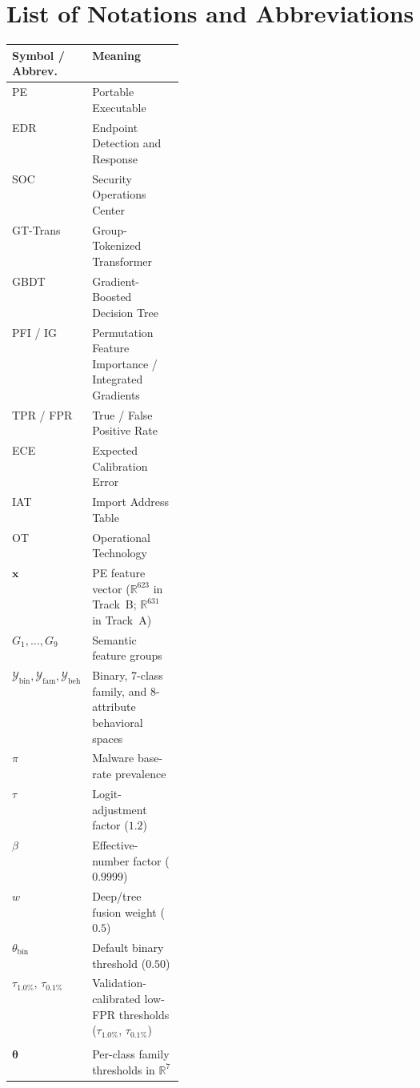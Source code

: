 \documentclass[Number]{sn-jnl}
\newcommand{\tauval}{\tau_{1.0\%}}
\newcommand{\tauzerov}{\tau_{0.1\%}}
\begin{document}
\section*{List of Notations and Abbreviations}
\begingroup
\small
\renewcommand{\arraystretch}{1.2}
\setlength{\tabcolsep}{6pt}
\noindent
\begin{tabularx}{\linewidth}{@{}>{\raggedright\arraybackslash}p{0.25\linewidth}X@{}}
\toprule
\textbf{Symbol / Abbrev.} & \textbf{Meaning} \\
\midrule
PE              & Portable Executable \\
EDR             & Endpoint Detection and Response \\
SOC             & Security Operations Center \\
GT-Trans        & Group-Tokenized Transformer \\
GBDT            & Gradient-Boosted Decision Tree \\
PFI / IG        & Permutation Feature Importance / Integrated Gradients \\
TPR / FPR       & True / False Positive Rate \\
ECE             & Expected Calibration Error \\
IAT             & Import Address Table \\
OT              & Operational Technology \\
\midrule
$\mathbf{x}$    & PE feature vector ($\mathbb{R}^{623}$ in Track~B; $\mathbb{R}^{631}$ in Track~A) \\
$G_1,\dots,G_9$ & Semantic feature groups \\
$\mathcal{Y}_\text{bin},\mathcal{Y}_\text{fam},\mathcal{Y}_\text{beh}$ & Binary, 7-class family, and 8-attribute behavioral spaces \\
$\pi$           & Malware base-rate prevalence \\
$\tau$          & Logit-adjustment factor ($1.2$) \\
$\beta$         & Effective-number factor ($0.9999$) \\
$w$             & Deep/tree fusion weight ($0.5$) \\
$\theta_\text{bin}$ & Default binary threshold ($0.50$) \\
$\tauval,\,\tauzerov$ & Validation-calibrated low-FPR thresholds ($\tau_{1.0\%}$, $\tau_{0.1\%}$) \\\\
$\boldsymbol{\theta}$ & Per-class family thresholds in $\mathbb{R}^7$ \\
\bottomrule
\end{tabularx}
\endgroup
\end{document}
